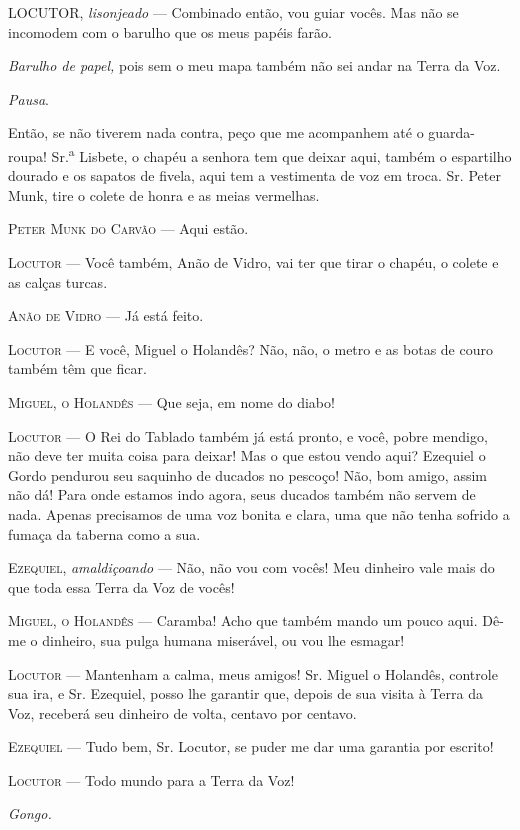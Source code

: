 LOCUTOR, \emph{lisonjeado} --- Combinado então, vou guiar vocês. Mas não
se incomodem com o barulho que os meus papéis farão.

\emph{Barulho de papel,} pois sem o meu mapa também não sei andar na
Terra da Voz.

\emph{Pausa}.

Então, se não tiverem nada contra, peço que me acompanhem até o
guarda-roupa! Sr.\textsuperscript{a} Lisbete, o chapéu a senhora tem que
deixar aqui, também o espartilho dourado e os sapatos de fivela, aqui
tem a vestimenta de voz em troca. Sr. Peter Munk, tire o colete de honra
e as meias vermelhas.

\textsc{Peter Munk do Carvão} --- Aqui estão.

\textsc{Locutor} --- Você também, Anão de Vidro, vai ter que tirar o chapéu, o
colete e as calças turcas.

\textsc{Anão de Vidro} --- Já está feito.

\textsc{Locutor} --- E você, Miguel o Holandês? Não, não, o metro e as botas de
couro também têm que ficar.

\textsc{Miguel, o Holandês} --- Que seja, em nome do diabo!

\textsc{Locutor} --- O Rei do Tablado também já está pronto, e você, pobre
mendigo, não deve ter muita coisa para deixar! Mas o que estou vendo
aqui? Ezequiel o Gordo pendurou seu saquinho de ducados no pescoço! Não,
bom amigo, assim não dá! Para onde estamos indo agora, seus ducados
também não servem de nada. Apenas precisamos de uma voz bonita e clara,
uma que não tenha sofrido a fumaça da taberna como a sua.

\textsc{Ezequiel}, \emph{amaldiçoando} --- Não, não vou com vocês! Meu dinheiro
vale mais do que toda essa Terra da Voz de vocês!

\textsc{Miguel, o Holandês} --- Caramba! Acho que também mando um pouco aqui. Dê-me
o dinheiro, sua pulga humana miserável, ou vou lhe esmagar!

\textsc{Locutor} --- Mantenham a calma, meus amigos! Sr. Miguel o Holandês,
controle sua ira, e Sr. Ezequiel, posso lhe garantir que, depois de sua
visita à Terra da Voz, receberá seu dinheiro de volta, centavo por
centavo.

\textsc{Ezequiel} --- Tudo bem, Sr. Locutor, se puder me dar uma garantia por
escrito!

\textsc{Locutor} --- Todo mundo para a Terra da Voz!

\emph{Gongo.}

